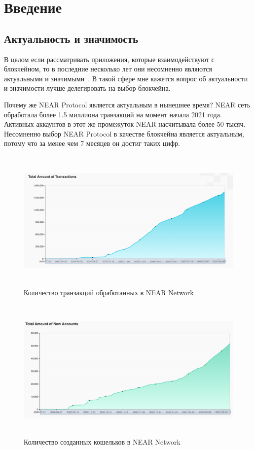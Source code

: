 \section{Введение}
\subsection{Актуальность и значимость}

В целом если рассматривать приложения, которые взаимодействуют с блокчейном, то в последние несколько лет они несомненно являются актуальными и значимыми~\cite{DBLP:journals/corr/abs-1712-04649}. В такой сфере мне кажется вопрос об актуальности и значимости лучше делегировать на выбор блокчейна.

Почему же NEAR Protocol является актуальным в нынешнее время? NEAR сеть обработала более 1.5 миллиона транзакций на момент начала 2021 года. Активных аккаунтов в этот же промежуток NEAR насчитывала более 50 тысяч. Несомненно выбор NEAR Protocol в качестве блокчейна является актуальным, потому что за менее чем 7 месяцев он достиг таких цифр.

\begin{figure}[H]
	\centering
	\includegraphics[height=70mm]{fig/near_1.png}
	\caption{Количество транзакций обработанных в NEAR Network}
\end{figure}


\begin{figure}[H]
	\centering
	\includegraphics[height=70mm]{fig/near_2.png}
	\caption{Количество созданных кошельков в NEAR Network}
\end{figure}

